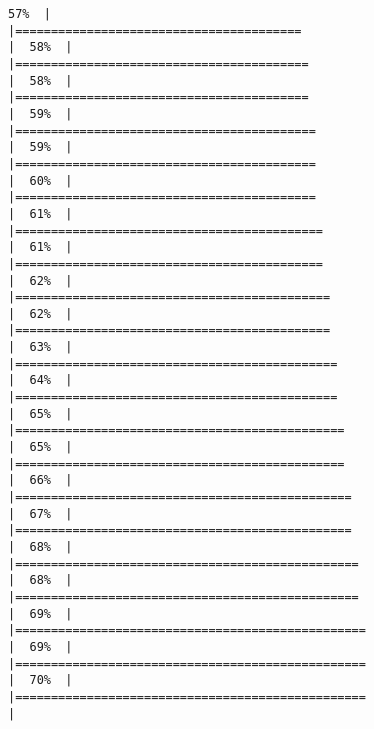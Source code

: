 \documentclass[
]{book}
\begin{document}
\begin{verbatim}
57%  |                                                                              |========================================                              |  58%  |                                                                              |=========================================                             |  58%  |                                                                              |=========================================                             |  59%  |                                                                              |==========================================                            |  59%  |                                                                              |==========================================                            |  60%  |                                                                              |==========================================                            |  61%  |                                                                              |===========================================                           |  61%  |                                                                              |===========================================                           |  62%  |                                                                              |============================================                          |  62%  |                                                                              |============================================                          |  63%  |                                                                              |=============================================                         |  64%  |                                                                              |=============================================                         |  65%  |                                                                              |==============================================                        |  65%  |                                                                              |==============================================                        |  66%  |                                                                              |===============================================                       |  67%  |                                                                              |===============================================                       |  68%  |                                                                              |================================================                      |  68%  |                                                                              |================================================                      |  69%  |                                                                              |=================================================                     |  69%  |                                                                              |=================================================                     |  70%  |                                                                              |=================================================                     |  
\end{verbatim}
\end{document}
